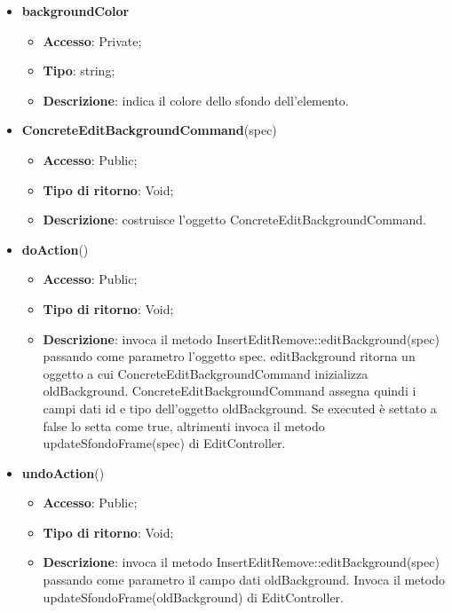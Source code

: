 {{{\begin{itemize}
\begin{itemize}
\begin{itemize}
\begin{itemize}
				\end{itemize}
				\item \textbf{backgroundColor}
				\begin{itemize}
					\item \textbf{Accesso}: Private;
					\item \textbf{Tipo}: string;
					\item \textbf{Descrizione}: indica il colore dello sfondo dell’elemento.
				\end{itemize}
			\end{itemize}
				\end{itemize}
				\end{itemize}
			\begin{itemize}
				\item \textbf{ConcreteEditBackgroundCommand}(spec)
				\begin{itemize}
					\item \textbf{Accesso}: Public;
					\item \textbf{Tipo di ritorno}: Void;
					\item \textbf{Descrizione}: costruisce l’oggetto ConcreteEditBackgroundCommand.
				\end{itemize}
				\item \textbf{doAction}()
				\begin{itemize}
					\item \textbf{Accesso}: Public;
					\item \textbf{Tipo di ritorno}: Void;
					\item \textbf{Descrizione}: invoca il metodo InsertEditRemove::editBackground(spec) passando come parametro l'oggetto spec. editBackground ritorna un oggetto a cui ConcreteEditBackgroundCommand inizializza oldBackground. ConcreteEditBackgroundCommand assegna quindi i campi dati id e tipo dell'oggetto oldBackground. Se executed è settato a false lo setta come true, altrimenti invoca il metodo updateSfondoFrame(spec) di EditController.
				\end{itemize}
				\item \textbf{undoAction}()
				\begin{itemize}
					\item \textbf{Accesso}: Public;
					\item \textbf{Tipo di ritorno}: Void;
					\item \textbf{Descrizione}: invoca il metodo InsertEditRemove::editBackground(spec) passando come parametro il campo dati oldBackground. Invoca il metodo updateSfondoFrame(oldBackground) di EditController.
				\end{itemize}
			\end{itemize}
			}

}}

